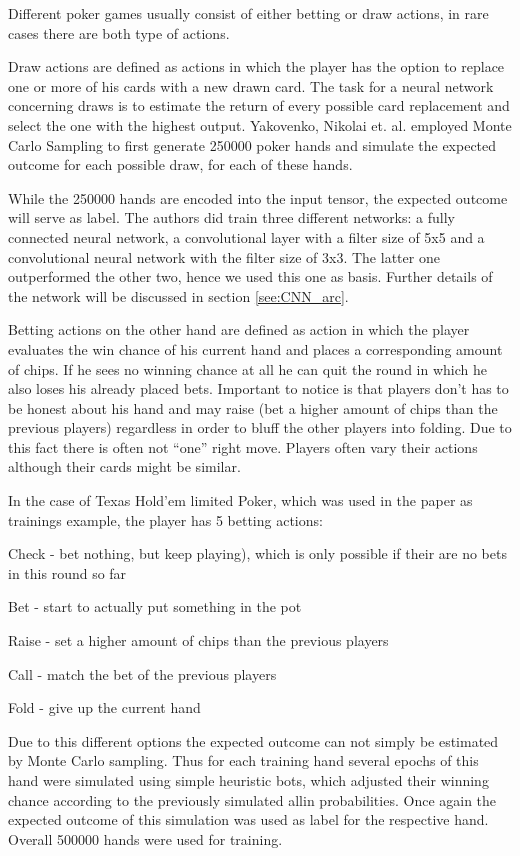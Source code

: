 \documentclass[]{report}
\begin{document}
Different poker games usually consist of either betting or draw actions,
in rare cases there are both type of actions. 

Draw actions are defined as actions in which the player has the option
to replace one or more of his cards with a new drawn card. The task
for a neural network concerning draws is to estimate the return of
every possible card replacement and select the one with the highest
output. Yakovenko, Nikolai et. al. employed Monte Carlo Sampling to
first generate 250000 poker hands and simulate the expected outcome
for each possible draw, for each of these hands.

While the 250000 hands are encoded into the input tensor, the expected
outcome will serve as label. The authors did train three different
networks: a fully connected neural network, a convolutional layer
with a filter size of 5x5 and a convolutional neural network with
the filter size of 3x3. The latter one outperformed the other two,
hence we used this one as basis. Further details of the network will
be discussed in section \ref{see:CNN_arc}. 

Betting actions on the other hand are defined as action in which the
player evaluates the win chance of his current hand and places a corresponding
amount of chips. If he sees no winning chance at all he can quit the
round in which he also loses his already placed bets. Important to
notice is that players don't has to be honest about his hand and may
raise (bet a higher amount of chips than the previous players) regardless
in order to bluff the other players into folding. Due to this fact
there is often not ``one'' right move. Players often vary their
actions although their cards might be similar. 

In the case of Texas Hold'em limited Poker, which was used in the
paper as trainings example, the player has 5 betting actions:

Check - bet nothing, but keep playing), which is only possible if
their are no bets in this round so far

Bet - start to actually put something in the pot

Raise - set a higher amount of chips than the previous players

Call - match the bet of the previous players

Fold - give up the current hand

Due to this different options the expected outcome can not simply
be estimated by Monte Carlo sampling. Thus for each training hand
several epochs of this hand were simulated using simple heuristic
bots, which adjusted their winning chance according to the previously
simulated allin probabilities. Once again the expected outcome of
this simulation was used as label for the respective hand. Overall
500000 hands were used for training. 
\end{document}
